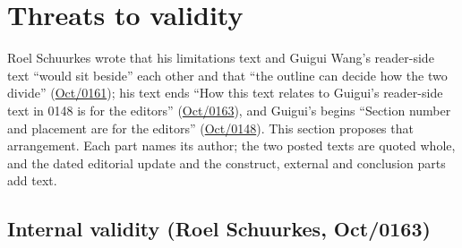 \providecommand{\aevmsg}[2]{\href{https://lists.w3.org/Archives/Public/public-agent-conformance/2026#1/#2.html}{#1/#2}}

\section{Threats to validity}
\label{sec:w3c-threats}

Roel Schuurkes wrote that his limitations text and Guigui Wang's reader-side text ``would sit beside'' each other and that ``the outline can decide how the two divide'' (\aevmsg{Oct}{0161}); his text ends ``How this text relates to Guigui's reader-side text in 0148 is for the editors'' (\aevmsg{Oct}{0163}), and Guigui's begins ``Section number and placement are for the editors'' (\aevmsg{Oct}{0148}). This section proposes that arrangement. Each part names its author; the two posted texts are quoted whole, and the dated editorial update and the construct, external and conclusion parts add text.

\subsection{Internal validity (Roel Schuurkes, Oct/0163)}

